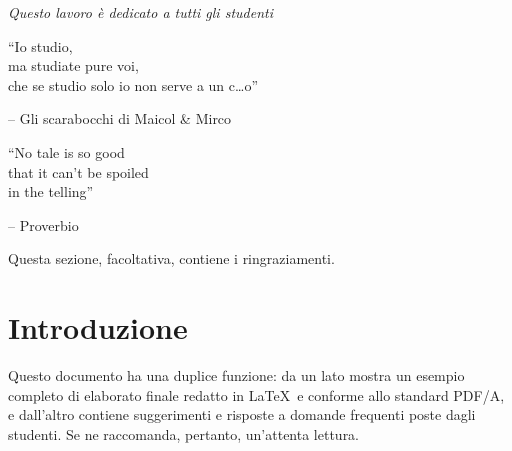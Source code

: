 \documentclass[12pt,italian]{report}
\begin{document}
\frontespizio
\beforepreface

% 
%

{\raggedleft \large \sl Questo lavoro \`{e} dedicato a tutti gli studenti\\
	
	\vspace{2cm}
	
	``Io studio,\\ma studiate pure voi,\\che se studio solo io non serve a un c\dots o''
	
	\bigskip
	
	\--- Gli scarabocchi di Maicol \& Mirco\\
  
	\vspace{2cm}
	
	``No tale is so good \\ that it can't be spoiled \\ in the telling''
	
	\bigskip
	
	\--- Proverbio\\}
         
% 
%


%
%

Questa sezione, facoltativa, contiene i ringraziamenti.

%
%

\afterpreface

% 
% 

\chapter*{Introduzione}
\label{cap:introduzione}

Questo documento ha una duplice funzione: da un lato mostra un esempio completo di elaborato finale redatto in \LaTeX\ e conforme allo standard PDF/A, e dall'altro contiene suggerimenti e risposte a domande frequenti poste dagli studenti. Se ne raccomanda, pertanto, un'attenta lettura.
\end{document}
